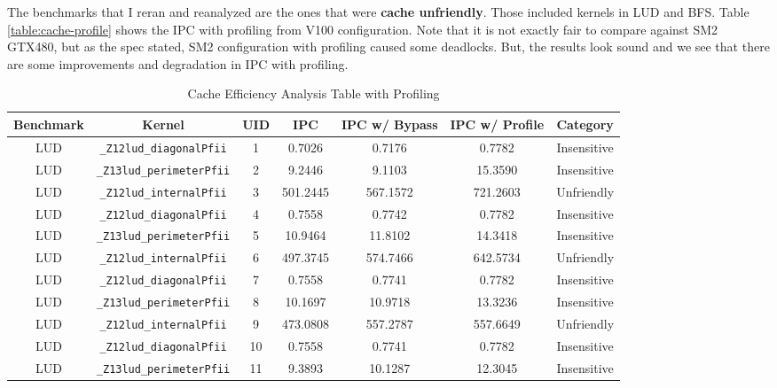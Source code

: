 \documentclass{article}
\begin{document}
The benchmarks that I reran and reanalyzed are the ones that were \textbf{cache unfriendly}. Those included kernels in LUD and BFS. Table \ref{table:cache-profile} shows the IPC with profiling from V100 configuration. Note that it is not exactly fair to compare against SM2 GTX480, but as the spec stated, SM2 configuration with profiling caused some deadlocks. But, the results look sound and we see that there are some improvements and degradation in IPC with profiling.

\begin{table}[H]
\small
\caption{Cache Efficiency Analysis Table with Profiling} %
\centering %
\begin{tabular}{c c c c c c c} %
\hline\hline %
Benchmark & Kernel & UID & IPC & IPC w/ Bypass & IPC w/ Profile & Category \\ [0.5ex] %
\hline %
LUD & \verb|_Z12lud_diagonalPfii|                    & 1  & 0.7026    & 0.7176   &    0.7782 & Insensitive\\
LUD & \verb|_Z13lud_perimeterPfii|                   & 2  & 9.2446    & 9.1103   &   15.3590 & Insensitive\\
LUD & \verb|_Z12lud_internalPfii|                    & 3  & 501.2445  & 567.1572 &  721.2603 & Unfriendly\\
LUD & \verb|_Z12lud_diagonalPfii|                    & 4  & 0.7558    & 0.7742   &    0.7782 & Insensitive\\
LUD & \verb|_Z13lud_perimeterPfii|                   & 5  & 10.9464   & 11.8102  &   14.3418 & Insensitive\\
LUD & \verb|_Z12lud_internalPfii|                    & 6  & 497.3745  & 574.7466 &  642.5734 & Unfriendly\\
LUD & \verb|_Z12lud_diagonalPfii|                    & 7  & 0.7558    & 0.7741   &    0.7782 & Insensitive\\
LUD & \verb|_Z13lud_perimeterPfii|                   & 8  & 10.1697   & 10.9718  &   13.3236 & Insensitive\\
LUD & \verb|_Z12lud_internalPfii|                    & 9  & 473.0808  & 557.2787 &  557.6649 & Unfriendly\\
LUD & \verb|_Z12lud_diagonalPfii|                    & 10 & 0.7558    & 0.7741   &    0.7782 & Insensitive\\
LUD & \verb|_Z13lud_perimeterPfii|                   & 11 & 9.3893    & 10.1287  &   12.3045 & Insensitive\\

\end{tabular}
\end{table}
\end{document}

